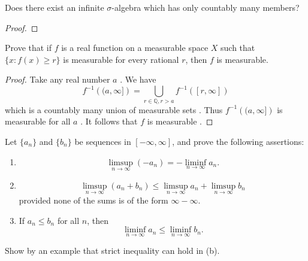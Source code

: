 \documentclass[../main.tex]{subfiles}
\begin{document}
\begin{problem}{}{}
Does there exist an infinite $\sigma$-algebra which has only countably many members?
\end{problem}

\begin{proof}
       
\end{proof}


\begin{problem}{}{}
Prove that if $f$ is a real function on a measurable space $X$ such that $\{x: f(x) \ge r\}$ is measurable for every rational $r$, then $f$ is measurable.
\end{problem}
\begin{proof}
    Take any real number \(  a  \) . We have \[
    f^{-1} \left( (a,\infty] \right)= \bigcup _{r \in \mathbb{Q} , r> a}f^{-1} \left( [r,\infty] \right)  
    \]which is a countably many union of measurable sets . Thus \(  f^{-1} \left( (a,\infty] \right)   \)  is measurable for all \(  a  \) . It follows that \(  f  \) is measurable .   
\end{proof}
\begin{problem}{}{}
Let $\{a_n\}$ and $\{b_n\}$ be sequences in $[-\infty, \infty]$, and prove the following assertions:
\begin{enumerate}
    \item[(a)] \[ \limsup_{n \to \infty} (-a_n) = -\liminf_{n \to \infty} a_n. \]
    \item[(b)] \[ \limsup_{n \to \infty} (a_n + b_n) \le \limsup_{n \to \infty} a_n + \limsup_{n \to \infty} b_n \]
    provided none of the sums is of the form $\infty - \infty$.
    \item[(c)] If $a_n \le b_n$ for all $n$, then
    \[ \liminf_{n \to \infty} a_n \le \liminf_{n \to \infty} b_n. \]
\end{enumerate}
Show by an example that strict inequality can hold in (b).
\end{problem}
\end{document}
